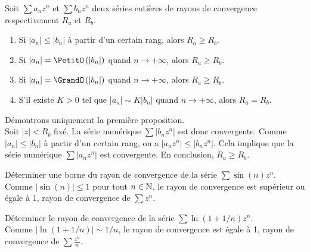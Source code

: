 \documentclass{book}
\begin{document}
\begin{Proposition}
Soit $\sum a_n z^n$ et $\sum b_n z^n$ deux séries entières de rayons de convergence
respectivement $R_a$ et $R_b$.
\begin{enumerate}
\item
  Si $|a_n| \leq  |b_n| $ à partir d'un certain rang, alors $R_a\geq R_b$.
\item
  Si $|a_n| = \PetitO \left(  |b_n| \right)$   quand $n\to+\infty $, alors $R_a\geq R_b$.
\item
  Si $|a_n| = \GrandO \left(  |b_n| \right)$   quand $n\to+\infty $, alors $R_a\geq R_b$.
\item
  S'il existe  $K>0$ tel que $|a_n| \sim K  |b_n|$ quand $n\to+\infty $, alors $R_a = R_b$.
\end{enumerate}
\end{Proposition}
\begin{Demonstration}
Démontrons uniquement la première proposition.\\
Soit $|z|<R_b$ fixé. La série numérique $\sum |b_n z^n|$ est donc convergente. Comme $|a_n| \leq  |b_n| $ à partir d'un certain rang, on a 
$|a_n z^n| \leq  |b_n z^n| $. Cela implique que la série numérique $\sum |a_n z^n|$ est  convergente. En conclusion, $R_a\geq R_b$.
\end{Demonstration}
\begin{Exemple}
Déterminer une borne du rayon de convergence de la série $\sum \sin(n)z^n$.\\
Comme $|\sin(n)|\leq 1$ pour tout $n\in \mathbb{N}$, le rayon de convergence est supérieur ou égale à 1, rayon de convergence de $\sum z^n$. 
\end{Exemple}
\begin{Exemple}
Déterminer le rayon de convergence de la série $\sum \ln(1+1/n)z^n$.\\
Comme $|\ln(1+1/n)|\sim 1/n$, le rayon de convergence est égale à 1, rayon de convergence de $\sum \frac{z^n}{n}$. 
\end{Exemple}
\end{document}
